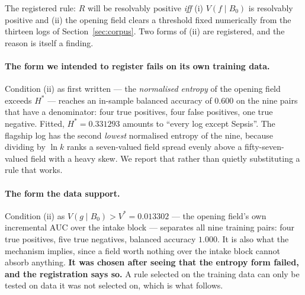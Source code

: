 \documentclass[preprint,12pt]{elsarticle}
\begin{document}
The registered rule: $R$ will be resolvably positive \emph{iff} (i)
$V(f \mid B_0)$ is resolvably positive and (ii) the opening field clears a
threshold fixed numerically from the thirteen logs of Section~\ref{sec:corpus}.
Two forms of (ii) are registered, and the reason is itself a finding.

\paragraph{The form we intended to register fails on its own training data.}
Condition (ii) as first written --- the \emph{normalised entropy} of the
opening field exceeds $H^*$ --- reaches an in-sample balanced accuracy of
$0.600$ on the nine pairs that have a denominator: four true positives, four
false positives, one true negative. Fitted, $H^* = 0.331293$ amounts to
``every log except Sepsis''. The flagship log has the second \emph{lowest}
normalised entropy of the nine, because dividing by $\ln k$ ranks a
seven-valued field spread evenly above a fifty-seven-valued field with a heavy
skew. We report that rather than quietly substituting a rule that works.

\paragraph{The form the data support.} Condition (ii) as
$V(g \mid B_0) > V^* = 0.013302$ --- the opening field's own incremental AUC
over the intake block --- separates all nine training pairs: four true
positives, five true negatives, balanced accuracy $1.000$. It is also what the
mechanism implies, since a field worth nothing over the intake block cannot
absorb anything. \textbf{It was chosen after seeing that the entropy form
failed, and the registration says so.} A rule selected on the training data
can only be tested on data it was not selected on, which is what follows.
\end{document}
